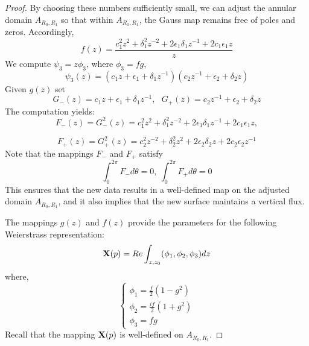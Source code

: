 \documentclass[10pt,a4paper]{amsart}
\begin{document}
\begin{proof}
   By choosing these numbers sufficiently small, we can adjust the annular domain $A_{R_0,R_1}$ so that within $A_{R_0,R_1}$, the Gauss map remains free of poles and zeros. Accordingly,
   $$  f(z)=\frac{c_1^2z^2+\delta_1^2z^{-2}+2\epsilon_1 \delta_1 z^{-1}+2c_1\epsilon_1z}{z}
    $$
We compute $\psi_3 =z\phi_3$, where $\phi_3=fg$,
$$
\psi_3 (z) = (c_1z+\epsilon_1 + \delta_1 z^{-1}) (c_2 z^{-1}+\epsilon_2 +\delta_2 z)
$$
Given $g(z)$ set
    $$
    G_-(z)= c_1z+\epsilon_1 + \delta_1 z^{-1},\ \ \  G_+(z)=c_2 z^{-1}+\epsilon_2 +\delta_2 z 
    $$
    The computation yields:
    $$
    F_-(z)=G_-^2(z)=c_1^2z^2+\delta_1^2z^{-2}+2\epsilon_1 \delta_1 z^{-1}+2c_1\epsilon_1z,
    $$
   
    $$
    F_+(z)=G_+^2(z)=c_2^2z^{-2}+\delta_2^2z^2+2\epsilon_2 \delta_2 z+2c_2\epsilon_2z^{-1}
    $$
    Note that the mappings $F_-$ and $F_+$ satisfy
    $$
    \int_0^{2\pi} F_- d\theta =0,\ \int_0^{2\pi} F_+ d\theta =0
    $$
    This ensures that the new data results in a well-defined map on the adjusted domain $A_{R_0,R_1}$, and it also implies that the new surface maintains a vertical flux.
   \medskip
   
    The mappings $g(z)$ and $f(z)$ provide the parameters for the following Weierstrass representation:
    $$
    \bold{X}(p) = Re \int_{z,z_0} (\phi_1,\phi_2,\phi_3)dz
    $$
    where,
    $$
    \begin{cases}
        \phi_1=\frac{f}{2}(1-g^2) \\
        \phi_2=\frac{if}{2} (1+g^2) \\
        \phi_3 =fg
    \end{cases}
    $$
    Recall that the mapping $\bold{X}(p)$ is well-defined on $A_{R_0,R_1}$. 
    \medskip
    

\end{proof}
\end{document}
